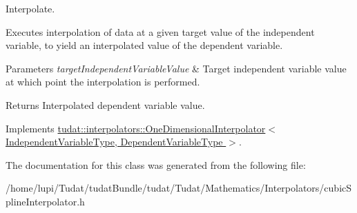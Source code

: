 Interpolate. 

Executes interpolation of data at a given target value of the independent variable, to yield an interpolated value of the dependent variable. 
\begin{DoxyParams}{Parameters}
{\em target\+Independent\+Variable\+Value} & Target independent variable value at which point the interpolation is performed. \\
\hline
\end{DoxyParams}
\begin{DoxyReturn}{Returns}
Interpolated dependent variable value. 
\end{DoxyReturn}


Implements \hyperlink{classtudat_1_1interpolators_1_1OneDimensionalInterpolator_a1756cce160465357493e18221aa49dee}{tudat\+::interpolators\+::\+One\+Dimensional\+Interpolator$<$ Independent\+Variable\+Type, Dependent\+Variable\+Type $>$}.



The documentation for this class was generated from the following file\+:\begin{DoxyCompactItemize}
\item 
/home/lupi/\+Tudat/tudat\+Bundle/tudat/\+Tudat/\+Mathematics/\+Interpolators/cubic\+Spline\+Interpolator.\+h\end{DoxyCompactItemize}
